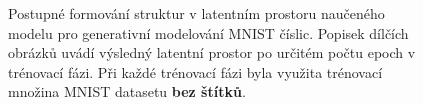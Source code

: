 \begin{figure}[H]
    \caption{Postupné formování struktur v latentním prostoru naučeného modelu pro generativní modelování MNIST číslic. Popisek dílčích obrázků uvádí výsledný latentní prostor po určitém počtu epoch v trénovací fázi. Při každé trénovací fázi byla využita trénovací množina MNIST datasetu \textbf{bez štítků}.}
    \label{fig:forming_latent_space}
\end{figure}

